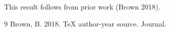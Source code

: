 \documentclass{article}
\begin{document}
This result follows from prior work (Brown 2018).
\begin{thebibliography}{9}
 Brown, B. 2018. TeX author-year source. Journal.
\end{thebibliography}
\end{document}
